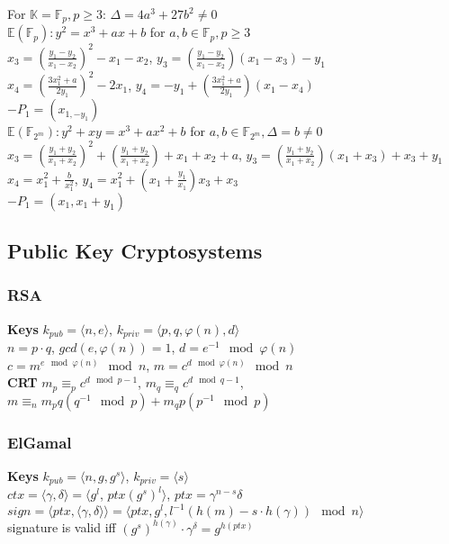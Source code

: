 \documentclass[twoside, 11pt]{article}
\begin{document}
            For $\mathds{K} = \mathds{F}_{p}, p \ge 3$: $\varDelta = 4a^{3} + 27b^{2} \neq 0$ \\
            $\mathds{E}(\mathds{F}_{p}): y^{2} = x^{3} + ax + b$ for $a, b \in \mathds{F}_{p}, p \ge 3$ \\
            $x_{3}=(\frac{y_{1}- y_{2}}{x_{1}-x_{2}})^{2} - x_{1} - x_{2}$, $y_{3} = (\frac{y_{1}-y_{2}}{x_{1}-x_{2}})(x_{1}-x_{3})-y_{1}$ \\
            $x_{4}=(\frac{3x_{1}^{2}+a}{2y_{1}})^{2}-2x_{1}$, $y_{4} = -y_{1}+(\frac{3x_{1}^{2}+a}{2y_{1}})(x_{1}-x_{4})$ \\
            $-P_{1} = (x_{1, -y_{1}})$ \\
            
            $\mathds{E}(\mathds{F}_{2^{m}}) : y^{2} + xy = x^{3} + ax^{2} + b$ for $a, b \in \mathds{F}_{2^{m}}, \varDelta = b\neq 0$ \\
            $x_{3}= (\frac{y_{1}+y_{2}}{x_{1}+x_{2}})^{2} + (\frac{y_{1}+y_{2}}{x_{1}+x_{2}}) + x_{1} + x_{2} + a$, $y_{3} = (\frac{y_{1}+y_{2}}{x_{1}+x_{2}})(x_{1}+ x_{3})+x_{3}+ y_{1}$ \\
            $x_{4} = x_{1}^{2}+\frac{b}{x_{1}^{2}}$, $y_{4}=x_{1}^{2}+(x_{1}+ \frac{y_{1}}{x_{1}})x_{3} + x_{3}$ \\
            $-P_{1} = (x_{1}, x_{1}+ y_{1})$\\

        \subsection*{Public Key Cryptosystems}
            \subsubsection*{RSA}
                \textbf{Keys} $k_{pub} = \langle n, e\rangle$, $k_{priv}=\langle p, q, \varphi(n), d\rangle$ \\
                $n=p\cdot q$, $gcd(e, \varphi(n))=1$, $d=e^{-1}\mod{\varphi(n)}$ \\
                $c=m^{e \mod{\varphi(n)}} \mod{n}$, $m=c^{d \mod{\varphi(n)}} \mod{n}$ \\
                \textbf{CRT} $m_{p} \equiv_{p} c^{d \mod{p-1}}$, $m_{q} \equiv_{q} c^{d \mod{q-1}}$, $m \equiv_{n} m_{p}q(q^{-1}\mod{p}) + m_{q}p(p^{-1}\mod{p})$

            \subsubsection*{ElGamal}
                \textbf{Keys} $k_{pub}=\langle n, g, g^{s}\rangle$, $k_{priv}=\langle s\rangle$ \\
                $ctx = \langle \gamma, \delta\rangle = \langle g^{l}$, $ptx(g^{s})^{l}\rangle$, $ptx = \gamma^{n-s}\delta$ \\
                $sign = \langle ptx, \langle \gamma, \delta\rangle\rangle = \langle ptx, g^{l}, l^{-1}(h(m)-s\cdot h(\gamma))\mod{n}\rangle$ \\
                signature is valid iff $(g^{s})^{h(\gamma)}\cdot\gamma^{\delta} = g^{h(ptx)}$
\end{document}
